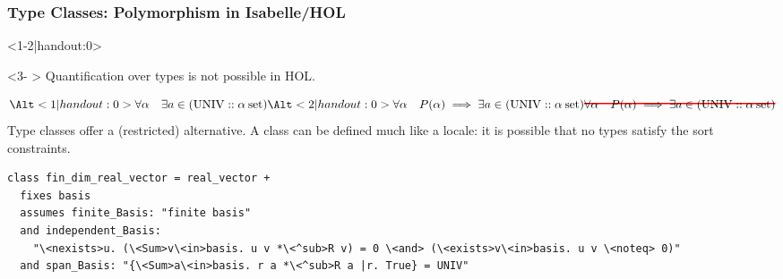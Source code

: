 \documentclass[12pt,notheorems,aspectratio=169,handout]{beamer} %
\begin{document}

\begin{frame}[fragile]\frametitle{Type Classes: Polymorphism in Isabelle/HOL}
\begin{onlyenv}<1-2|handout:0>
\phantom{Quantification over types is not possible in HOL.}
\end{onlyenv}
\begin{onlyenv}<3- >
Quantification over types is not possible in HOL.
\end{onlyenv}
\[
\Alt<1|handout:0>
  {\all{\alpha} \exists a \in (\mathrm{UNIV} :: \alpha \:\mathrm{set})}
  {\Alt<2|handout:0>
    {\all{\alpha} P (\alpha) \implies \exists a \in (\mathrm{UNIV} :: \alpha \:\mathrm{set})}
    {\hcancel[red]{\all{\alpha} P (\alpha) \implies \exists a \in (\mathrm{UNIV} :: \alpha \:\mathrm{set})}}
  }
\]
\pause
\pause
\pause
Type classes offer a (restricted) alternative. A class can be defined much like a locale: it is possible that no types satisfy the sort constraints.
\begin{lstlisting}
class fin_dim_real_vector = real_vector +
  fixes basis
  assumes finite_Basis: "finite basis"
  and independent_Basis:
    "\<nexists>u. (\<Sum>v\<in>basis. u v *\<^sub>R v) = 0 \<and> (\<exists>v\<in>basis. u v \<noteq> 0)"
  and span_Basis: "{\<Sum>a\<in>basis. r a *\<^sub>R a |r. True} = UNIV"
\end{lstlisting}
\end{frame}
\end{document}
